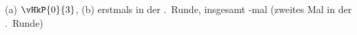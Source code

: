 (a) $\vHkP{0}{3}$, (b) erstmals in der \rUI.~Runde, insgesamt \kGI-mal (zweites Mal in der \rZI.~Runde)
